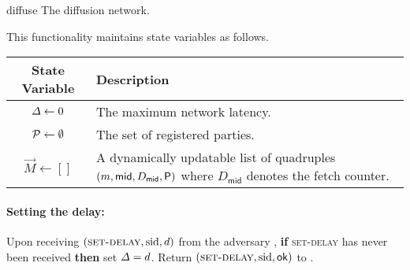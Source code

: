 \begin{cccFunctionality}
      {\funcDiffuse}
      {diffuse}
      {The diffusion network.}

      \newcommand*{\msgid}{\ensuremath{\mathsf{mid}}\xspace}
      \newcommand*{\vecM}{\ensuremath{\vec{M}}\xspace}

      This functionality maintains state variables as follows.

      \begin{minipage}{\linewidth}
            \addtocounter{table}{-1}
            \begin{tabularx}{.9\textwidth}{c  X}
                  \toprule[.3mm]
                  \textbf{State Variable}
                   & \textbf{Description}
                  \\ \midrule[.3mm]
                  $\varDelta \gets 0$
                   & The maximum network latency.
                  \\ \midrule
                  $\mathcal{P} \gets \emptyset$
                   & The set of registered parties.
                  \\ \midrule
                  $\vecM \gets [] $
                   & A dynamically updatable list of quadruples $(m, \msgid, D_{\msgid}, \party)$ where $D_{\msgid}$ denotes the fetch counter.
                  \\ \bottomrule[.3mm]
            \end{tabularx}
      \end{minipage}

      \medskip\paragraph{Setting the delay:}
      \begin{cccItemize}[nosep]
            \item Upon  receiving $(\textsc{set-delay}, \mathrm{sid}, d)$ from the adversary \adv, \textbf{if} \textsc{set-delay} has never been received \textbf{then} set $\varDelta = d$. Return $(\textsc{set-delay}, \mathrm{sid}, \mathsf{ok})$ to \adv.
      \end{cccItemize}


\end{cccFunctionality}
